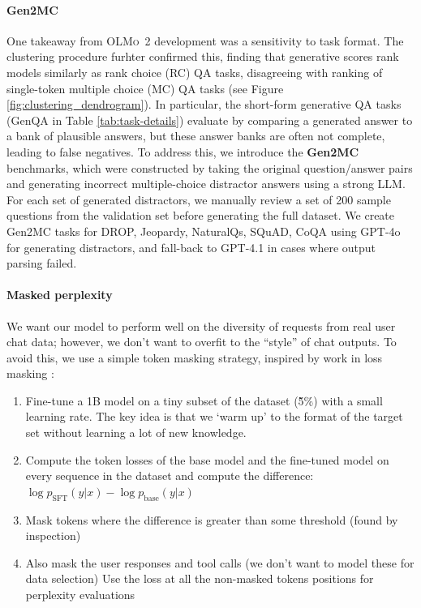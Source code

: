 \documentclass[table]{ai2style/ai2}
\newcommand{\oldOlmo}{OLMo\xspace}
\newcommand{\olmotoo}{\textsc{\oldOlmo~2}\xspace}
\begin{document}
{{\paragraph{Gen2MC} One takeaway from \olmotoo development was a sensitivity to task format. The clustering procedure furhter confirmed this, finding that generative scores rank models similarly as rank choice (RC) QA tasks, disagreeing with ranking of single-token multiple choice (MC) QA tasks (see Figure \ref{fig:clustering_dendrogram}). In particular, the short-form generative QA tasks (GenQA in Table \ref{tab:task-details}) evaluate by comparing a generated answer to a bank of plausible answers, but these answer banks are often not complete, leading to false negatives. To address this, we introduce the \textbf{Gen2MC} benchmarks, which were constructed by taking the original question/answer pairs and generating incorrect multiple-choice distractor answers using a strong LLM. For each set of generated distractors, we manually review a set of 200 sample questions from the validation set before generating the full dataset. We create Gen2MC tasks for DROP, Jeopardy, NaturalQs, SQuAD, CoQA using GPT-4o for generating distractors, and fall-back to GPT-4.1 in cases where output parsing failed.

\paragraph{Masked perplexity} We want our model to perform well on the diversity of requests from real user chat data; however, we don’t want to overfit to the ``style'' of chat outputs.
To avoid this, we use a simple token masking strategy, inspired by work in loss masking \citep{mindermann2022prioritized}:

\begin{enumerate}
\item Fine-tune a 1B model on a tiny subset of the dataset (\~5\%) with a small learning rate. The key idea is that we `warm up' to the format of the target set without learning a lot of new knowledge.
\item Compute the token losses of the base model and the fine-tuned model on every sequence in the dataset and compute the difference: $\log p_{\text{SFT}}(y | x) - \log p_\text{base}(y | x)$
\item Mask tokens where the difference is greater than some threshold (found by inspection)
\item Also mask the user responses and tool calls (we don’t want to model these for data selection)
Use the loss at all the non-masked tokens positions for perplexity evaluations
\end{enumerate}

}}
\end{document}
